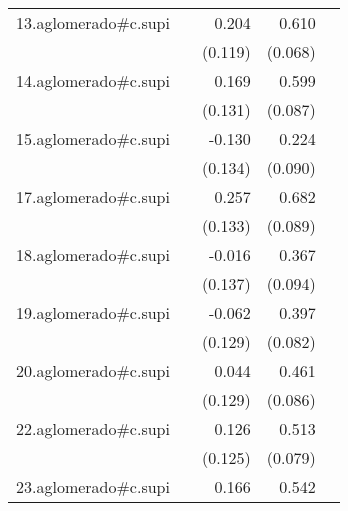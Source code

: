 {\begin{longtable}{l*{4}{D{.}{.}{-1}}}
\addlinespace
13.aglomerado#c.supi&                     &       0.204         &       0.610\sym{***}&                     \\
            &                     &     (0.119)         &     (0.068)         &                     \\
\addlinespace
14.aglomerado#c.supi&                     &       0.169         &       0.599\sym{***}&                     \\
            &                     &     (0.131)         &     (0.087)         &                     \\
\addlinespace
15.aglomerado#c.supi&                     &      -0.130         &       0.224\sym{*}  &                     \\
            &                     &     (0.134)         &     (0.090)         &                     \\
\addlinespace
17.aglomerado#c.supi&                     &       0.257         &       0.682\sym{***}&                     \\
            &                     &     (0.133)         &     (0.089)         &                     \\
\addlinespace
18.aglomerado#c.supi&                     &      -0.016         &       0.367\sym{***}&                     \\
            &                     &     (0.137)         &     (0.094)         &                     \\
\addlinespace
19.aglomerado#c.supi&                     &      -0.062         &       0.397\sym{***}&                     \\
            &                     &     (0.129)         &     (0.082)         &                     \\
\addlinespace
20.aglomerado#c.supi&                     &       0.044         &       0.461\sym{***}&                     \\
            &                     &     (0.129)         &     (0.086)         &                     \\
\addlinespace
22.aglomerado#c.supi&                     &       0.126         &       0.513\sym{***}&                     \\
            &                     &     (0.125)         &     (0.079)         &                     \\
\addlinespace
23.aglomerado#c.supi&                     &       0.166         &       0.542\sym{***}&                     \\

\end{longtable}}
